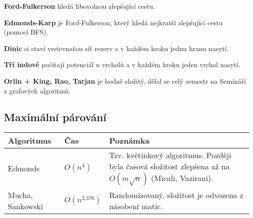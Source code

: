 \begin{itemize*}
\item \textbf{Ford-Fulkerson} hledá libovolnou zlepšující cestu. 
\item \textbf{Edmonds-Karp} je Ford-Fulkerson, který hledá nejkratší
zlepšující cestu (pomocí BFS). 
\item \textbf{Dinic} si staví vrstevnatou síť rezerv a v každém kroku jednu
hranu nasytí. 
\item \textbf{Tři indové} počítají potenciál u vrcholů a v každém kroku
jeden vrchol nasytí. 
\item \textbf{Orlin + King, Rao, Tarjan} je hodně složitý, dělal se celý
semestr na Semináři z grafových algoritmů.
\end{itemize*}

\subsection{Maximální párování}

\begin{center}
\begin{tabular}{ l l p{10cm} }
	\hline
	\bf Algoritmus & \bf Čas & \bf Poznámka \\
	\hline
	Edmonds & $O(n^4)$ & Tzv. květinkový algoritmus. Později byla časová složitost zlepšena až na $O(m\sqrt n)$ (Micali, Vazirani). \\
	Mucha, Sankowski & $O(n^{2.376})$ & Randomizovaný, složitost je odvozena z násobení matic. \\
	\hline
\end{tabular}
\end{center}


\renewcommand{\arraystretch}{1.0}

